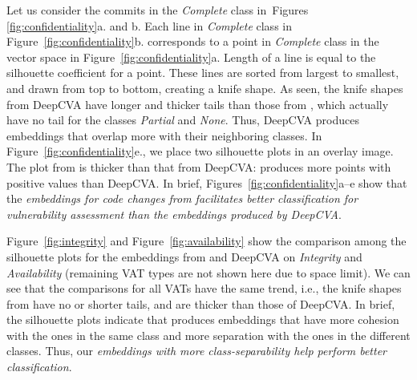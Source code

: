 Let us consider the commits in the {\em Complete} class
in~Figures \ref{fig:confidentiality}a. and b. Each line in {\em
Complete} class in Figure~\ref{fig:confidentiality}b. corresponds to a
point in {\em Complete} class in the vector space in
Figure~\ref{fig:confidentiality}a. Length of a line is equal to
the silhouette coefficient for a point. These lines are
sorted from largest to smallest, and drawn from top to bottom, creating
a knife shape. As seen, the knife shapes from DeepCVA have longer and thicker
tails than those from {\tool}, which actually have no tail for the
classes {\em Partial} and {\em None}. 
Thus, DeepCVA produces embeddings that overlap more with their
neighboring classes.  In Figure~\ref{fig:confidentiality}e., we place
two silhouette plots in an overlay image. The plot from {\tool} is
thicker than that from DeepCVA: {\tool} produces more points with
positive values than DeepCVA. In brief,
Figures~\ref{fig:confidentiality}a--e show that the {\em embeddings
for code changes from {\tool} facilitates better classification for
vulnerability assessment than the embeddings produced by DeepCVA}.



Figure~\ref{fig:integrity} and Figure~\ref{fig:availability} show the
comparison among the silhouette plots for the embeddings from {\tool}
and DeepCVA on {\em Integrity} and {\em Availability} (remaining VAT
types are not shown here due to space limit). We can see that the
comparisons for all VATs have the same trend, i.e., the knife shapes
from {\tool} have no or shorter tails, and are thicker than those of
DeepCVA. In brief, the silhouette plots indicate that {\tool} produces
embeddings that have more cohesion with the ones in the same class and
more separation with the ones in the different classes. Thus, our {\em
  embeddings with more class-separability help {\tool} perform better
  classification}.



